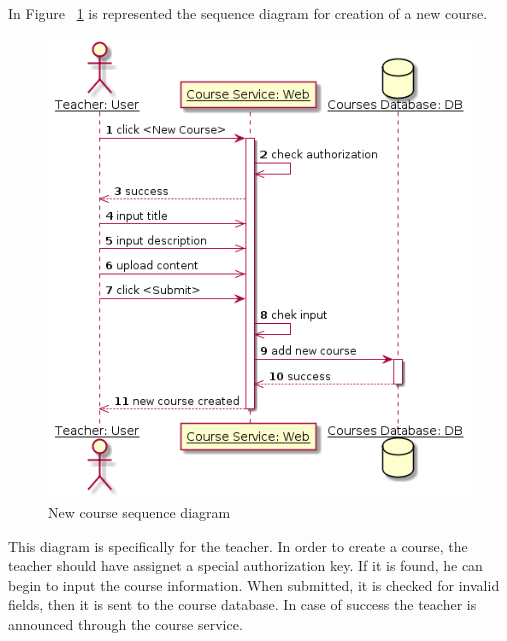 \documentclass[12pt,a4paper,titlepage]{article}
\begin{document}
In Figure ~\ref{fig:create} is represented the sequence diagram for creation of a new course.
\begin{figure}[H]
	\centering
	\includegraphics[width=\textwidth]{create}
	\caption{New course sequence diagram}
	\label{fig:create}
\end{figure}
This diagram is specifically for the teacher. In order to create a course, the teacher should have assignet a special authorization key. If it is found, he can begin to input the course information. When submitted, it is checked for invalid fields, then it is sent to the course database. In case of success the teacher is announced through the course service.
\end{document}
